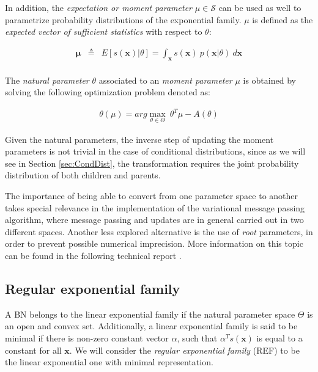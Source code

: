 \documentclass[11pt, oneside]{article}   	%
\newcommand{\bm}{\mathbf}
\numberwithin{figure}{section}
\numberwithin{equation}{section}
\numberwithin{table}{section}
\newcommand{\e}[1]{E\left[ #1 \right]}
\theoremstyle{definition}
\begin{document}
In addition, the \emph{expectation or moment parameter} $\mu\in\mathcal{S}$ can be used as well to parametrize probability
distributions of the exponential family. $\mu$ is defined as the \emph{expected vector of sufficient statistics} with respect to $\theta$:

\begin{equation}
\label{Equation:NaturalToMoment}
\begin{array}{lll}
\bm \mu & \triangleq & \e{s(\bm x)|\theta}  = \int_{\bm x} s(\bm x)~p(\bm x|\theta)~d\bm x\\
\end{array}
\end{equation}

The \emph{natural parameter} $\theta$ associated to an \emph{moment parameter} $\mu$ is obtained by solving the following optimization problem denoted as:
 
\begin{eqnarray}
\label{Equation:MomentToNatural}
\theta(\mu) = arg\max_{\theta\in\Theta}~\theta^T\mu -A(\theta)
\end{eqnarray}

Given the natural parameters, the inverse step of updating the moment parameters is not trivial in the case of conditional distributions, since as we will see in Section \ref{sec:CondDist}, the transformation requires the joint probability distribution of both children and parents. 

The importance of being able to convert from one parameter space to another takes special relevance in the implementation of the variational message passing algorithm, where message passing and updates are in general carried out in two different spaces. Another less explored alternative is the use of \textit{root} parameters, in order to prevent possible numerical imprecision. More information on this topic can be found in the following technical report \cite{HowJeb05}.

\subsection*{Regular exponential family}

A BN belongs to the linear exponential family if the natural parameter space $\Theta$ is an open and convex set. Additionally, a linear exponential family is said to be minimal if there is non-zero constant vector $\alpha$, such that $\alpha^Ts(\bm x)$ is equal to a constant for all $\bm x$.  We will consider the \textit{regular exponential family} (REF) to be the linear exponential one with minimal representation.
\end{document}
